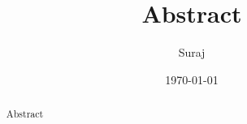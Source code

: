 \documentclass{article}
\title{Abstract}
\author{Suraj}
\date{\today}
\begin{document}
    \maketitle
    \begin{abstract}
        Abstract
    \end{abstract}
    
\end{document}
